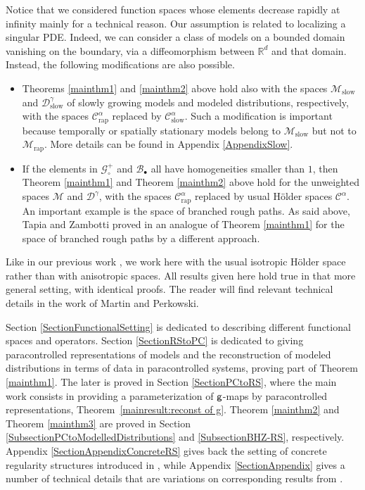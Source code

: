 \documentclass[11pt]{article}
\numberwithin{equation}{section}
\newcommand{\sbullet}{{\scriptscriptstyle\bullet}}
\theoremstyle{plain}
\theoremstyle{definition}
\newcommand{\rap}{\mathrm{rap}}
\newcommand{\slow}{\mathrm{slow}}
\newcommand{\scrM}{\mathscr{M}}
\newcommand{\mcB}{\mathcal{B}}
\newcommand{\mcC}{\mathcal{C}}
\newcommand{\mcD}{\mathcal{D}}
\newcommand{\mcG}{\mathcal{G}}
\begin{document}
Notice that we considered function spaces whose elements decrease rapidly at infinity mainly for a technical reason. Our assumption is related to localizing a singular PDE. Indeed, we can consider a class of models on a bounded domain vanishing on the boundary, via a diffeomorphism between $\mathbb{R}^d$ and that domain. Instead, the following modifications are also possible.
\begin{itemize}
\item Theorems \ref{mainthm1} and \ref{mainthm2} above hold also with the spaces $\scrM_{\slow}$ and $\mcD_{\slow}^\gamma$ of slowly growing models and modeled distributions, respectively, with the spaces $\mcC_{\rap}^\alpha$ replaced by $\mcC_{\slow}^\alpha$. Such a modification is important because temporally or spatially stationary models belong to $\scrM_{\slow}$ but not to $\scrM_{\rap}$. More details can be found in Appendix \ref{AppendixSlow}.

\item If the elements in $\mcG_\circ^+$ and $\mcB_\sbullet$ all have homogeneities smaller than $1$, then Theorem \ref{mainthm1} and Theorem \ref{mainthm2} above hold for the unweighted spaces $\scrM$ and $\mcD^\gamma$, with the spaces $\mcC_{\rap}^\alpha$ replaced by usual Hölder spaces $\mcC^\alpha$. An important example is the space of branched rough paths. As said above, Tapia and Zambotti proved in \cite{TZ18} an analogue of Theorem \ref{mainthm1} for the space of branched rough paths by a different approach.
\end{itemize}

Like in our previous work \cite{BH}, we work here with the usual isotropic Hölder space rather than with anisotropic spaces. All results given here hold true in that more general setting, with identical proofs. The reader will find relevant technical details in the work \cite{MP18} of Martin and Perkowski.\enlargethispage{.5\baselineskip}%

Section \ref{SectionFunctionalSetting} is dedicated to describing different functional spaces and operators. Section \ref{SectionRStoPC} is dedicated to giving paracontrolled representations of models and the recons\-truction of modeled distributions in terms of data in paracontrolled systems, proving part of Theorem \ref{mainthm1}. The later is proved in Section \ref{SectionPCtoRS}, where the main work consists in providing a parameterization of $\sf g$-maps by paracontrolled representations, Theorem~\ref{mainresult:reconst of g}. Theorem \ref{mainthm2} and Theorem \ref{mainthm3} are proved in Section \ref{SubsectionPCtoModelledDistributions} and \ref{SubsectionBHZ-RS}, respectively. Appendix \ref{SectionAppendixConcreteRS} gives back the setting of concrete regularity structures introduced in \cite{BH}, while Appendix \ref{SectionAppendix} gives a number of technical details that are variations on corresponding results from \cite{BH}.
\end{document}
